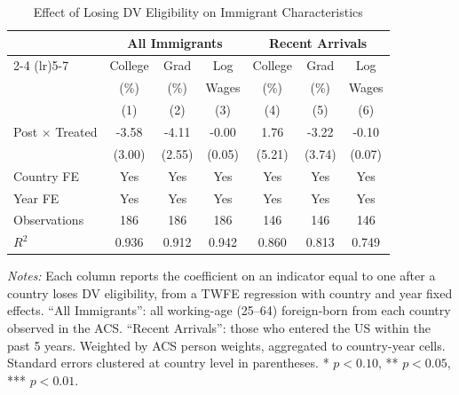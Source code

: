 \begin{table}[t]
\centering
\caption{Effect of Losing DV Eligibility on Immigrant Characteristics}
\label{tab:main}
\small
\begin{threeparttable}
\begin{tabular}{lcccccc}
\toprule
 & \multicolumn{3}{c}{All Immigrants} & \multicolumn{3}{c}{Recent Arrivals} \\
\cmidrule(lr){2-4} \cmidrule(lr){5-7}
 & College & Grad & Log & College & Grad & Log \\
 & (\%) & (\%) & Wages & (\%) & (\%) & Wages \\
 & (1) & (2) & (3) & (4) & (5) & (6) \\
\midrule
Post $\times$ Treated & -3.58 & -4.11 & -0.00 & 1.76 & -3.22 & -0.10 \\
 & (3.00) & (2.55) & (0.05) & (5.21) & (3.74) & (0.07) \\
\midrule
Country FE & Yes & Yes & Yes & Yes & Yes & Yes \\
Year FE & Yes & Yes & Yes & Yes & Yes & Yes \\
Observations & 186 & 186 & 186 & 146 & 146 & 146 \\
$R^2$ & 0.936 & 0.912 & 0.942 & 0.860 & 0.813 & 0.749 \\
\bottomrule
\end{tabular}
\begin{tablenotes}[flushleft]
\small
\item \textit{Notes:} Each column reports the coefficient on an indicator equal to one after a country loses DV eligibility, from a TWFE regression with country and year fixed effects. ``All Immigrants'': all working-age (25--64) foreign-born from each country observed in the ACS. ``Recent Arrivals'': those who entered the US within the past 5 years. Weighted by ACS person weights, aggregated to country-year cells. Standard errors clustered at country level in parentheses. * $p<0.10$, ** $p<0.05$, *** $p<0.01$.
\end{tablenotes}
\end{threeparttable}
\end{table}
